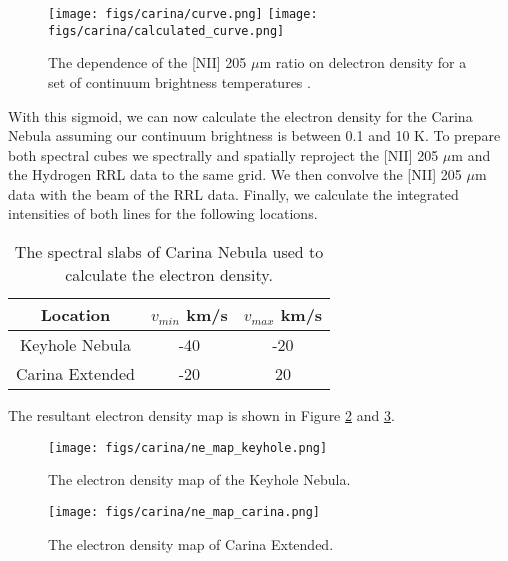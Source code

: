 \begin{figure}[h]
    \centering
    \texttt{[image: figs/carina/curve.png]}
    \texttt{[image: figs/carina/calculated\_curve.png]}
    \caption{The dependence of the [NII] 205 $\mu$m ratio on delectron density for a set of continuum brightness temperatures \cite{pineda2018}.}
    \label{fig:ne_vs_tc}
\end{figure}

With this sigmoid, we can now calculate the electron density for the Carina Nebula assuming our continuum brightness is between 0.1 and 10 K.
To prepare both spectral cubes we spectrally and spatially reproject the [NII] 205 $\mu$m and the Hydrogen RRL data to the same grid.
We then convolve the [NII] 205 $\mu$m data with the beam of the RRL data. 
Finally, we calculate the integrated intensities of both lines for the following locations.

\begin{table}[h!]
    \centering
    \begin{tabular}{|c|c|c|}
        \hline
        Location & $v_{min}$ km/s & $v_{max}$ km/s \\
        \hline
        Keyhole Nebula & -40 & -20 \\
        Carina Extended & -20 & 20 \\
        \hline
    \end{tabular}
    \caption{The spectral slabs of Carina Nebula used to calculate the electron density.}
    \label{tab:carina}
\end{table}

The resultant electron density map is shown in Figure \ref{fig:ne_map_keyhole} and \ref{fig:ne_map_carina}.

\begin{figure}[h]
    \centering
    \texttt{[image: figs/carina/ne\_map\_keyhole.png]}
    \caption{The electron density map of the Keyhole Nebula.}
    \label{fig:ne_map_keyhole}
\end{figure}

\begin{figure}[h]
    \centering
    \texttt{[image: figs/carina/ne\_map\_carina.png]}
    \caption{The electron density map of Carina Extended.}
    \label{fig:ne_map_carina}
\end{figure}